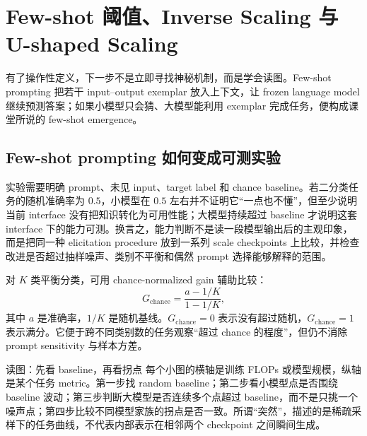 \section{Few-shot 阈值、Inverse Scaling 与 U-shaped Scaling}

有了操作性定义，下一步不是立即寻找神秘机制，而是学会读图。Few-shot prompting 把若干 input--output exemplar 放入上下文，让 frozen language model 继续预测答案；如果小模型只会猜、大模型能利用 exemplar 完成任务，便构成课堂所说的 few-shot emergence。

\subsection{Few-shot prompting 如何变成可测实验}

实验需要明确 prompt、未见 input、target label 和 chance baseline。若二分类任务的随机准确率为 $0.5$，小模型在 $0.5$ 左右并不证明它“一点也不懂”，但至少说明当前 interface 没有把知识转化为可用性能；大模型持续超过 baseline 才说明这套 interface 下的能力可测。换言之，能力判断不是读一段模型输出后的主观印象，而是把同一种 elicitation procedure 放到一系列 scale checkpoints 上比较，并检查改进是否超过抽样噪声、类别不平衡和偶然 prompt 选择能够解释的范围。


对 $K$ 类平衡分类，可用 chance-normalized gain 辅助比较：
\[
G_{\mathrm{chance}}=\frac{a-1/K}{1-1/K},
\]
其中 $a$ 是准确率，$1/K$ 是随机基线。$G_{\mathrm{chance}}=0$ 表示没有超过随机，$G_{\mathrm{chance}}=1$ 表示满分。它便于跨不同类别数的任务观察“超过 chance 的程度”，但仍不消除 prompt sensitivity 与样本方差。


\begin{knowledgebox}{读图：先看 baseline，再看拐点}
每个小图的横轴是训练 FLOPs 或模型规模，纵轴是某个任务 metric。第一步找 random baseline；第二步看小模型点是否围绕 baseline 波动；第三步判断大模型是否连续多个点超过 baseline，而不是只挑一个噪声点；第四步比较不同模型家族的拐点是否一致。所谓“突然”，描述的是稀疏采样下的任务曲线，不代表内部表示在相邻两个 checkpoint 之间瞬间生成。
\end{knowledgebox}


